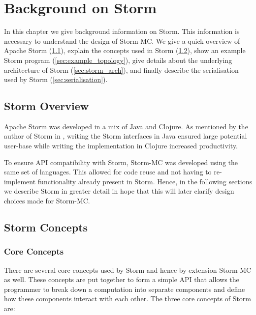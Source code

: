 \documentclass[bsc,twoside,singlespacing,normalheadings,parskip]{infthesis}\usepackage[]{graphicx}\usepackage[]{color}
\begin{document}
\clearpage{}\chapter{Background on Storm}

In this chapter we give background information on Storm. This information is necessary to understand the design of Storm-MC. We give a quick overview of Apache Storm (\ref{sec:storm_overview}), explain the concepts used in Storm (\ref{sec:concepts}), show an example Storm program (\ref{sec:example_topology}), give details about the underlying architecture of Storm (\ref{sec:storm_arch}), and finally describe the serialisation used by Storm (\ref{sec:serialisation}).

\section{Storm Overview}
\label{sec:storm_overview}

Apache Storm was developed in a mix of Java and Clojure. As mentioned by the author of Storm in \cite{Marz_2014}, writing the Storm interfaces in Java ensured large potential user-base while writing the implementation in Clojure increased productivity.

To ensure API compatibility with Storm, Storm-MC was developed using the same set of languages. This allowed for code reuse and not having to re-implement functionality already present in Storm. Hence, in the following sections we describe Storm in greater detail in hope that this will later clarify design choices made for Storm-MC.

\section{Storm Concepts}
\label{sec:concepts}

\subsection{Core Concepts}

There are several core concepts used by Storm and hence by extension Storm-MC as well. These concepts are put together to form a simple API that allows the programmer to break down a computation into separate components and define how these components interact with each other. The three core concepts of Storm are:
\end{document}
